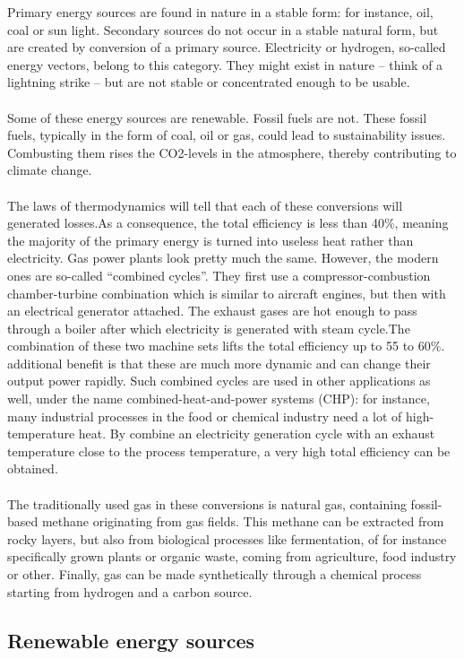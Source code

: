\documentclass[../summary.tex]{subfiles}
\begin{document}
	Primary energy sources are found in nature in a stable form: for instance, oil, coal or sun light. Secondary sources do not occur in a stable natural form, but are created by conversion of a primary source. Electricity or hydrogen, so-called energy vectors, belong to this category. They might exist in nature – think of a lightning strike – but are not stable or concentrated enough to be usable.
	\\\\
	Some of these energy sources are renewable. Fossil fuels are not. These fossil fuels, typically in the form of coal, oil or gas, could lead to sustainability issues. Combusting them rises the CO2-levels in the atmosphere, thereby contributing to climate change. 
	\\\\
	The laws of thermodynamics will tell that each of these conversions will generated losses.As a consequence, the total efficiency is less than 40\%, meaning the majority of the primary energy is turned into useless heat rather than electricity. Gas power plants look pretty much the same. However, the modern ones are so-called “combined cycles”. They first use a compressor-combustion chamber-turbine combination which is similar to aircraft engines, but then with an electrical generator attached. The exhaust gases are hot enough to pass through a boiler after which electricity is generated with steam cycle.The combination of these two machine sets lifts the total efficiency up to 55 to 60\%. additional benefit is that these are much more dynamic and can change their output power rapidly. Such combined cycles are used in other applications as well, under the name combined-heat-and-power systems (CHP): for instance, many industrial processes in the food or chemical industry need a lot of high-temperature heat. By combine an electricity generation cycle with an exhaust temperature close to the process temperature, a very high total efficiency can be obtained.
	\\\\
	The traditionally used gas in these conversions is natural gas, containing fossil-based methane originating from gas fields. This methane can be extracted from rocky layers, but also from biological processes like fermentation, of for instance specifically grown plants or organic waste, coming from agriculture, food industry or other. Finally, gas can be made synthetically through a chemical process starting from hydrogen and a carbon source.
	
	\subsection{Renewable energy sources}
	
\end{document}
